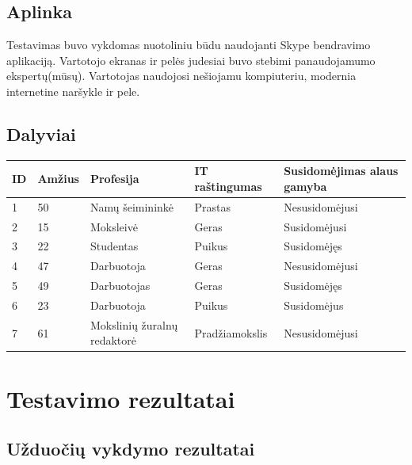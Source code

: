 \documentclass[oneside]{VUMIFPSkursinis}
\begin{document}
	\subsection{Aplinka}
		Testavimas buvo vykdomas nuotoliniu būdu naudojanti Skype bendravimo aplikaciją.
		Vartotojo ekranas ir pelės judesiai buvo stebimi panaudojamumo ekspertų(mūsų).
		Vartotojas naudojosi nešiojamu kompiuteriu, modernia internetine naršykle ir pele.
	\subsection{Dalyviai}
\begin{center}
    \begin{tabular}{ |p{1cm} | p{2cm} | p{4cm} | p{4cm} | p{4cm} |}
    \hline
	ID&Amžius&Profesija&IT raštingumas&Susidomėjimas alaus gamyba\\ \hline
	1&50&Namų šeimininkė&Prastas&Nesusidomėjusi \\ \hline
	2&15&Moksleivė&Geras&Susidomėjusi \\ \hline
	3&22&Studentas&Puikus&Susidomėjęs \\ \hline
	4&47&Darbuotoja&Geras&Nesusidomėjusi \\ \hline
	5&49&Darbuotojas&Geras&Susidomėjęs \\ \hline
	6&23&Darbuotoja&Puikus&Susidomėjus \\ \hline
	7&61&Mokslinių žuralnų redaktorė&Pradžiamokslis&Nesusidomėjusi \\ \hline
   \hline
    \end{tabular}
\end{center}



\section{Testavimo rezultatai}
	\subsection{Užduočių vykdymo rezultatai}
\end{document}
